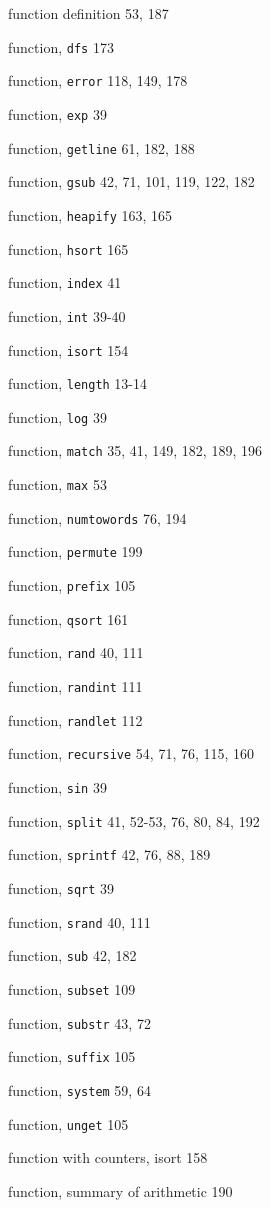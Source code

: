 \begin{multicols}{3}
function definition 53, 187

function, \verb'dfs' 173

function, \verb'error' 118, 149, 178

function, \verb'exp' 39

function, \verb'getline' 61, 182, 188

function, \verb'gsub' 42, 71, 101, 119, 122, 182

function, \verb'heapify' 163, 165

function, \verb'hsort' 165

function, \verb'index' 41

function, \verb'int' 39-40

function, \verb'isort' 154

function, \verb'length' 13-14

function, \verb'log' 39

function, \verb'match' 35, 41, 149, 182, 189, 196

function, \verb'max' 53

function, \verb'numtowords' 76, 194

function, \verb'permute' 199

function, \verb'prefix' 105

function, \verb'qsort' 161

function, \verb'rand' 40, 111

function, \verb'randint' 111

function, \verb'randlet' 112

function, \verb'recursive' 54, 71, 76, 115, 160

function, \verb'sin' 39

function, \verb'split' 41, 52-53, 76, 80, 84, 192

function, \verb'sprintf' 42, 76, 88, 189

function, \verb'sqrt' 39

function, \verb'srand' 40, 111

function, \verb'sub' 42, 182

function, \verb'subset' 109

function, \verb'substr' 43, 72

function, \verb'suffix' 105

function, \verb'system' 59, 64

function, \verb'unget' 105

function with counters, isort 158

function, summary of arithmetic 190


\end{multicols}
